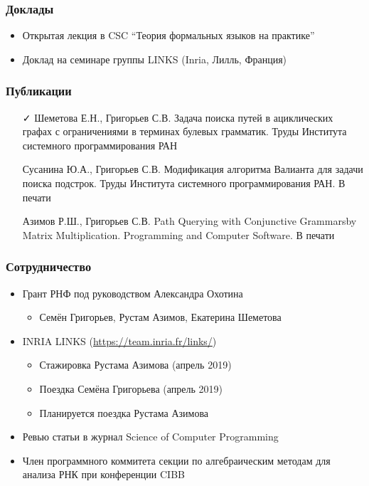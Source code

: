 \documentclass[xcolor=table]{beamer}
\begin{document}
\begin{frame}[fragile]

  \frametitle{Доклады}
\begin{itemize}

      \item Открытая лекция в CSC ``Теория формальных языков на практике''

      \item Доклад на семинаре группы LINKS (Inria, Лилль, Франция)

\end{itemize}
\end{frame}


\begin{frame}[fragile]

  \frametitle{Публикации}
\begin{itemize}
      \item[\faCheck] Шеметова Е.Н., Григорьев С.В. Задача поиска путей в ациклических графах с ограничениями в терминах булевых грамматик. Труды Института системного программирования РАН
      \item[\faHourglassHalf] Сусанина Ю.А., Григорьев С.В. Модификация алгоритма Валианта для задачи поиска подстрок. Труды Института системного программирования РАН. В печати
      \item[\faHourglassHalf] Азимов Р.Ш., Григорьев С.В. Path Querying with Conjunctive Grammarsby Matrix Multiplication. Programming and Computer Software. В печати
\end{itemize}
\end{frame}

\begin{frame}[fragile]

  \frametitle{Сотрудничество}
\begin{itemize}
      \item Грант РНФ под руководством Александра Охотина
      \begin{itemize}
        \item Семён Григорьев, Рустам Азимов, Екатерина Шеметова
      \end{itemize}
      \item INRIA LINKS (\url{https://team.inria.fr/links/})
      \begin{itemize}
         \item Стажировка Рустама Азимова (апрель 2019)
         \item Поездка Семёна Григорьева (апрель 2019)
         \item Планируется поездка Рустама Азимова
      \end{itemize}
      \pause
      \item Ревью статьи в журнал Science of Computer Programming
      \item Член программного коммитета секции по алгебраическим методам для анализа РНК при конференции CIBB

\end{itemize}
\end{frame}
\end{document}
